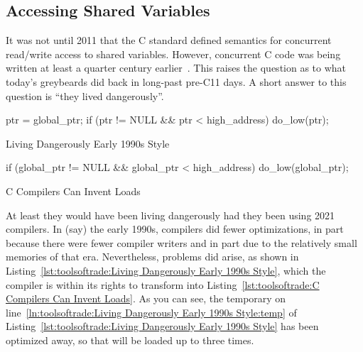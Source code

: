 \subsection{Accessing Shared Variables}
\label{sec:toolsoftrade:Accessing Shared Variables}

It was not until 2011 that the C standard defined semantics for concurrent
read/write access to shared variables.
However, concurrent C code was being written at least a quarter century
earlier~\cite{Beck85,Inman85}.
This raises the question as to what today's greybeards did back
in long-past pre-C11 days.
A short answer to this question is ``they lived dangerously''.

\begin{listing}[tbp]
\begin{fcvlabel}
\begin{VerbatimL}[commandchars=\\\{\}]
ptr = global_ptr;
if (ptr != NULL && ptr < high_address)
	do_low(ptr);
\end{VerbatimL}
\end{fcvlabel}
\caption{Living Dangerously Early 1990s Style}
\label{lst:toolsoftrade:Living Dangerously Early 1990s Style}
\end{listing}

\begin{listing}[tbp]
\begin{fcvlabel}
\begin{VerbatimL}[commandchars=\\\{\}]
if (global_ptr != NULL &&
    global_ptr < high_address)
	do_low(global_ptr);
\end{VerbatimL}
\end{fcvlabel}
\caption{C Compilers Can Invent Loads}
\label{lst:toolsoftrade:C Compilers Can Invent Loads}
\end{listing}

At least they would have been living dangerously had they been using
2021 compilers.
In (say) the early 1990s, compilers did fewer optimizations, in part
because there were fewer compiler writers and in part due to the
relatively small memories of that era.
Nevertheless, problems did arise, as shown in
Listing~\ref{lst:toolsoftrade:Living Dangerously Early 1990s Style},
which the compiler is within its rights to transform into
Listing~\ref{lst:toolsoftrade:C Compilers Can Invent Loads}.
As you can see, the temporary on
line~\ref{ln:toolsoftrade:Living Dangerously Early 1990s Style:temp} of
Listing~\ref{lst:toolsoftrade:Living Dangerously Early 1990s Style}
has been optimized away, so that  will be loaded
up to three times.

